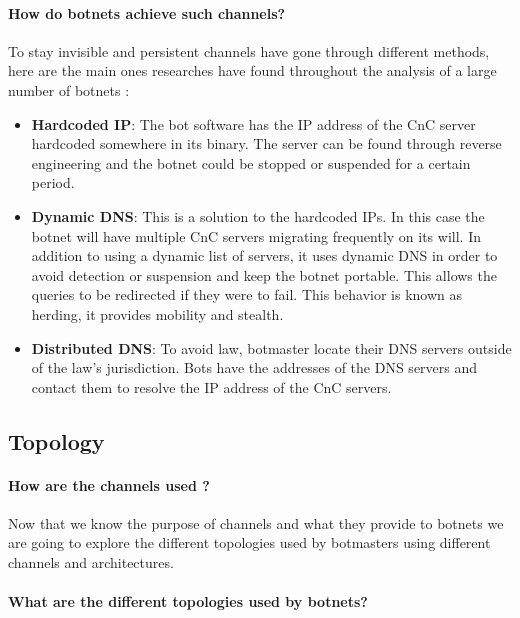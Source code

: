 \paragraph{How do botnets achieve such channels?}
To stay invisible and persistent channels have gone through different methods, here are the main ones researches have found throughout the analysis of a large number of botnets \cite{detection5} \cite{bot-threat}: 
\begin{itemize}[noitemsep]
\item \textbf{Hardcoded IP}: The bot software has the IP address of the CnC server hardcoded somewhere in its binary. The server can be found through reverse engineering and the botnet could be stopped or suspended for a certain period.
\item \textbf{Dynamic DNS}: This is a solution to the hardcoded IPs. In this case the botnet will have multiple CnC servers migrating frequently on its will. In addition to using a dynamic list of servers, it uses dynamic DNS in order to avoid detection or suspension and keep the botnet portable. This allows the queries to be redirected if they were to fail. This behavior is known as herding, it provides mobility and stealth.
\item \textbf{Distributed DNS}: To avoid law, botmaster locate their DNS servers outside of the law's jurisdiction. Bots have the addresses of the DNS servers and contact them to resolve the IP address of the CnC servers.
\end{itemize}

\subsection{Topology}
\paragraph{How are the channels used ?}
Now that we know the purpose of channels and what they provide to botnets we are going to explore the different topologies used by botmasters using different channels and architectures.

\paragraph{What are the different topologies used by botnets?}

